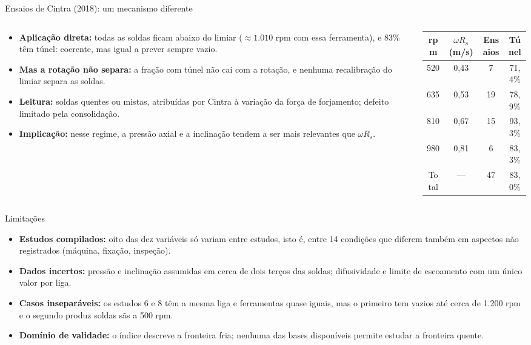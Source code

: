 \documentclass[aspectratio=169,11pt]{beamer}
\newcommand{\fonte}[1]{\par\vspace{2pt}{\scriptsize\color{cinza}#1}}
\newenvironment{bullets}{\begin{itemize}\setlength{\itemsep}{5pt}}{\end{itemize}}
\begin{document}
\begin{frame}{Ensaios de Cintra (2018): um mecanismo diferente}
\begin{columns}[T,onlytextwidth]
\begin{column}{0.55\textwidth}
\begin{bullets}
  \item \textbf{Aplicação direta:} todas as soldas ficam abaixo do limiar ($\approx 1.010$ rpm com essa ferramenta), e 83\% têm túnel: coerente, mas igual a prever sempre vazio.
  \item \textbf{Mas a rotação não separa:} a fração com túnel não cai com a rotação, e nenhuma recalibração do limiar separa as soldas.
  \item \textbf{Leitura:} soldas quentes ou mistas, atribuídas por Cintra à variação da força de forjamento; defeito limitado pela consolidação.
  \item \textbf{Implicação:} nesse regime, a pressão axial e a inclinação tendem a ser mais relevantes que $\omega R_s$.
\end{bullets}
\end{column}
\begin{column}{0.42\textwidth}
\centering\scriptsize\setlength{\tabcolsep}{4pt}
\begin{tabular}{cccc}
\toprule
\textbf{rpm} & \textbf{$\omega R_s$ (m/s)} & \textbf{Ensaios} & \textbf{Túnel} \\ \midrule
520 & 0,43 & 7 & 71,4\% \\
635 & 0,53 & 19 & 78,9\% \\
810 & 0,67 & 15 & 93,3\% \\
980 & 0,81 & 6 & 83,3\% \\ \midrule
Total & --- & 47 & 83,0\% \\ \bottomrule
\end{tabular}
\fonte{Ensaios de Cintra (2018) por rotação}
\end{column}
\end{columns}
\end{frame}

\begin{frame}{Limitações}
\vspace{0.2cm}
\begin{bullets}
  \item \textbf{Estudos compilados:} oito das dez variáveis só variam entre estudos, isto é, entre 14 condições que diferem também em aspectos não registrados (máquina, fixação, inspeção).
  \item \textbf{Dados incertos:} pressão e inclinação assumidas em cerca de dois terços das soldas; difusividade e limite de escoamento com um único valor por liga.
  \item \textbf{Casos inseparáveis:} os estudos 6 e 8 têm a mesma liga e ferramentas quase iguais, mas o primeiro tem vazios até cerca de 1.200 rpm e o segundo produz soldas sãs a 500 rpm.
  \item \textbf{Domínio de validade:} o índice descreve a fronteira fria; nenhuma das bases disponíveis permite estudar a fronteira quente.
\end{bullets}
\end{frame}
\end{document}
